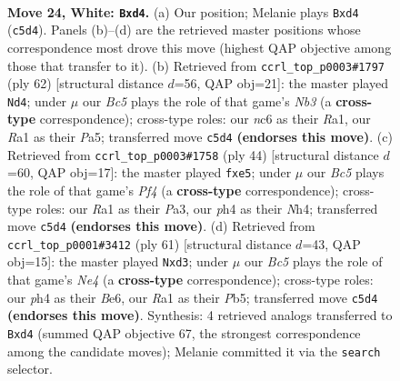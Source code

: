 \documentclass[11pt]{article}
\begin{document}
\clearpage

\begin{figure}[p]\centering
\begin{subfigure}{0.46\textwidth}\centering
\resizebox{\linewidth}{!}{%
\newchessgame
\chessboard[
  setfen={r5kr/8/2n5/2Bp2p1/p2b3p/P4P2/3N2PP/R4R1K w - - 0 24},
  showmover=false,
  pgfstyle=straightmove, color=movearrow, markmove={c5-d4}
]}
\caption{}
\end{subfigure}\hfill
\begin{subfigure}{0.46\textwidth}\centering
\resizebox{\linewidth}{!}{%
\newchessgame
\chessboard[
  setfen={2rr4/pp4kp/3P4/PP6/8/1N4Pp/2b2P1P/R3R1K1 w - - 0 32},
  showmover=false,
  pgfstyle=straightmove, color=movearrow, markmove={b3-d4}
]}
\caption{}
\end{subfigure}
\\[4pt]
\begin{subfigure}{0.46\textwidth}\centering
\resizebox{\linewidth}{!}{%
\newchessgame
\chessboard[
  setfen={r5kr/pp6/4bp1p/B1n1p3/3p1P1N/P7/2P3PP/R4RK1 w - - 0 23},
  showmover=false,
  pgfstyle=straightmove, color=movearrow, markmove={f4-e5}
]}
\caption{}
\end{subfigure}\hfill
\begin{subfigure}{0.46\textwidth}\centering
\resizebox{\linewidth}{!}{%
\newchessgame
\chessboard[
  setfen={1rr2k2/5pp1/4b2p/1p1pn3/1P6/3BPP2/4N1PP/R2R2K1 b - - 4 31},
  showmover=false,
  pgfstyle=straightmove, color=movearrow, markmove={e5-d3}
]}
\caption{}
\end{subfigure}
\caption{\textbf{Move 24, White: \texttt{Bxd4}.} (a) Our position; Melanie plays \texttt{Bxd4} (\texttt{c5d4}). Panels (b)--(d) are the retrieved master positions whose correspondence most drove this move (highest QAP objective among those that transfer to it). (b) Retrieved from \texttt{ccrl\_top\_p0003\#1797} (ply 62) [structural distance $d$=56, QAP obj=21]: the master played \texttt{Nd4}; under $\mu$ our \emph{Bc5} plays the role of that game's \emph{Nb3} (a \textbf{cross-type} correspondence); cross-type roles: our \emph{n}c6 as their \emph{R}a1, our \emph{R}a1 as their \emph{P}a5; transferred move \texttt{c5d4} \textbf{(endorses this move)}. (c) Retrieved from \texttt{ccrl\_top\_p0003\#1758} (ply 44) [structural distance $d$=60, QAP obj=17]: the master played \texttt{fxe5}; under $\mu$ our \emph{Bc5} plays the role of that game's \emph{Pf4} (a \textbf{cross-type} correspondence); cross-type roles: our \emph{R}a1 as their \emph{P}a3, our \emph{p}h4 as their \emph{N}h4; transferred move \texttt{c5d4} \textbf{(endorses this move)}. (d) Retrieved from \texttt{ccrl\_top\_p0001\#3412} (ply 61) [structural distance $d$=43, QAP obj=15]: the master played \texttt{Nxd3}; under $\mu$ our \emph{Bc5} plays the role of that game's \emph{Ne4} (a \textbf{cross-type} correspondence); cross-type roles: our \emph{p}h4 as their \emph{B}e6, our \emph{R}a1 as their \emph{P}b5; transferred move \texttt{c5d4} \textbf{(endorses this move)}. Synthesis: 4 retrieved analogs transferred to \texttt{Bxd4} (summed QAP objective 67, the strongest correspondence among the candidate moves); Melanie committed it via the \texttt{search} selector.}
\label{fig:thought-m46}
\end{figure}
\end{document}
